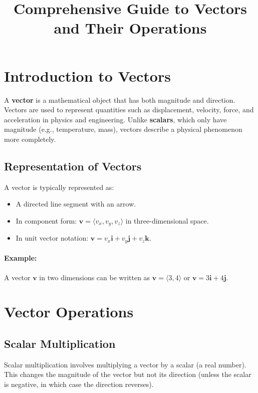 \documentclass[12pt]{article}
\title{\textbf{Comprehensive Guide to Vectors and Their Operations}}
\author{}
\date{}
\begin{document}
\maketitle

\tableofcontents

\newpage

\section{Introduction to Vectors}
A \textbf{vector} is a mathematical object that has both magnitude and direction. Vectors are used to represent quantities such as displacement, velocity, force, and acceleration in physics and engineering. Unlike \textbf{scalars}, which only have magnitude (e.g., temperature, mass), vectors describe a physical phenomenon more completely.

\subsection{Representation of Vectors}
A vector is typically represented as:
\begin{itemize}
    \item A directed line segment with an arrow.
    \item In component form: $\mathbf{v} = \langle v_x, v_y, v_z \rangle$ in three-dimensional space.
    \item In unit vector notation: $\mathbf{v} = v_x \mathbf{i} + v_y \mathbf{j} + v_z \mathbf{k}$.
\end{itemize}

\paragraph{Example:} A vector $\mathbf{v}$ in two dimensions can be written as $\mathbf{v} = \langle 3, 4 \rangle$ or $\mathbf{v} = 3\mathbf{i} + 4\mathbf{j}$.

\section{Vector Operations}

\subsection{Scalar Multiplication}
Scalar multiplication involves multiplying a vector by a scalar (a real number). This changes the magnitude of the vector but not its direction (unless the scalar is negative, in which case the direction reverses).
\end{document}

